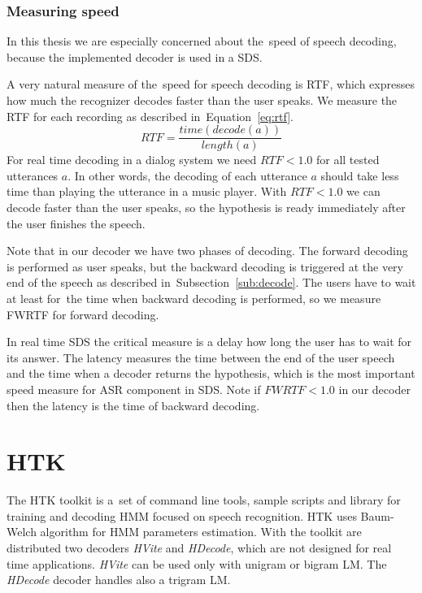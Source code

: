 {\subsubsection*{Measuring speed}
\label{sub:the_metrics_in_speech_recognition}
In this thesis we are especially concerned about the~speed of speech decoding,
because the implemented decoder is used in a \acl{SDS}.

A very natural measure of the~speed for speech decoding is \acl{RTF},
which expresses how much the recognizer decodes faster than the user speaks.
We measure the \ac{RTF} for each recording as described in~Equation~\ref{eq:rtf}.
\begin{equation}\label{eq:rtf}
    RTF = \frac{time(decode(a))}{length(a)}
\end{equation}
For real time decoding in a dialog system we need $RTF < 1.0$ for all tested utterances $a$.
In other words, the decoding of each utterance $a$ should take less time than
playing the utterance in a music player.
With $RTF < 1.0$ we can decode faster than the user speaks, 
so the hypothesis is ready immediately after the user finishes the speech. 

Note that in our decoder we have two phases of decoding.
The forward decoding is performed as user speaks, but
the backward decoding is triggered at the very end of the speech
as described in~Subsection~\ref{sub:decode}.
The users have to wait at least for~the time when backward decoding is performed,
so we measure \ac{FWRTF} for forward decoding.

In real time \ac{SDS} the critical measure is a delay how long the user
has to wait for its answer.
The latency measures the time between the end of the user speech and
the time when a decoder returns the hypothesis, 
which is the most important speed measure for \ac{ASR} component in \ac{SDS}.
Note if $FWRTF < 1.0 $ in our decoder then the latency is the time of backward decoding.


\section{\ac{HTK}}
\label{sec:back_htk}
The \ac{HTK} toolkit is a~set of command line tools, sample scripts and library
for training and decoding \ac{HMM} focused on speech recognition.
\ac{HTK} uses Baum-Welch algorithm for \ac{HMM} parameters estimation.
With the toolkit are distributed two decoders {\it HVite} and {\it HDecode},
which are not designed for real time applications.
{\it HVite} can be used only with unigram or bigram \ac{LM}. 
The {\it HDecode} decoder handles also a trigram \ac{LM}.

}

